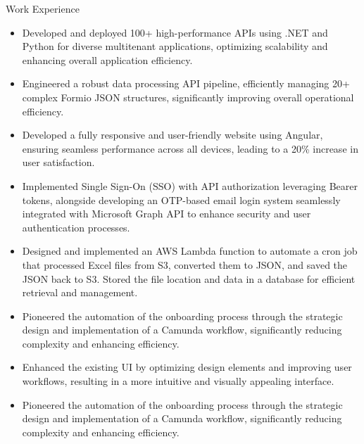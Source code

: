 \documentclass{resume}
\begin{document}
\begin{experienceSection}{Work Experience}
    \experienceItem[
        company={EXL Digital},
        location={Noida Sec-144},
        position={FullStack Developer},
        duration={Aug 2023 – Present}
    ]
    \begin{itemize}
        \itemsep -6pt {}
        \item Developed and deployed 100+ high-performance APIs using .NET and Python for diverse multitenant applications, optimizing scalability and enhancing overall application efficiency.
        \item Engineered a robust data processing API pipeline, efficiently managing 20+ complex Formio JSON structures, significantly improving overall operational efficiency.
        \item Developed a fully responsive and user-friendly website using Angular, ensuring seamless performance across all devices, leading to a 20\% increase in user satisfaction.
        \item Implemented Single Sign-On (SSO) with API authorization leveraging Bearer tokens, alongside developing an OTP-based email login system seamlessly integrated with Microsoft Graph API to enhance security and user authentication processes.
        \item Designed and implemented an AWS Lambda function to automate a cron job that processed Excel files from S3, converted them to JSON, and saved the JSON back to S3. Stored the file location and data in a database for efficient retrieval and management.
        \item Pioneered the automation of the onboarding process through the strategic design and implementation of a Camunda workflow, significantly reducing complexity and enhancing efficiency.
    \end{itemize}
    \experienceItem[
        company={Nokia},
        location={Chennai},
        position={Web Developer Intern},
        duration={Jun 2018 – Jul 2018}
    ]
    \begin{itemize}
        \itemsep -6pt {}
        \item Enhanced the existing UI by optimizing design elements and improving user workflows, resulting in a more intuitive and visually appealing interface.
        \item Pioneered the automation of the onboarding process through the strategic design and implementation of a Camunda workflow, significantly reducing complexity and enhancing efficiency.
    \end{itemize}
\end{experienceSection}
\end{document}
